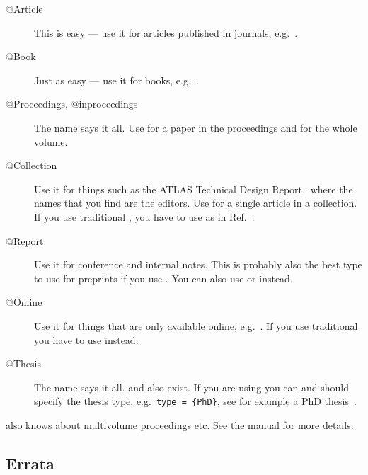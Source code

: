 \documentclass[UKenglish, texlive=2016]{\ATLASLATEXPATH atlasdoc}
\begin{document}
\begin{description}
\item[@Article] This is easy --- use it for articles published in
  journals, e.g.~\cite{lhcCollaboration:2012}.
\item[@Book] Just as easy --- use it for books, e.g.~\cite{kopka04}.
\item[@Proceedings, @inproceedings] The name says it all. Use
   for a paper in the proceedings and
   for the whole volume.
\item[@Collection] Use it for things such as the ATLAS Technical Design
  Report~\cite{lhc:vol1a} where the names that you find are the
  editors. Use  for a single article in a
  collection.
  If you use traditional \BibTeX, you have to use  as in Ref.~\cite{lhc:vol1b}.
\item[@Report] Use it for conference and
  internal notes. This is
  probably also the best type to use for preprints if you use .
  You can also use  or  instead.
\item[@Online] Use it for things that are only available online,
  e.g.~\cite{lshort}.
  If you use traditional \BibTeX you have to use  instead.
\item[@Thesis] The name says it all.
   and
  also exist. If you are using  you can and should specify
  the thesis type, e.g.\ \texttt{type = \{PhD\}}, see for example a
  PhD thesis~\cite{tlodd:2012}.
\end{description}

 also knows about multivolume proceedings etc.
See the manual for more details.


\subsection{Errata}
\label{sec:erratum}
\end{document}
